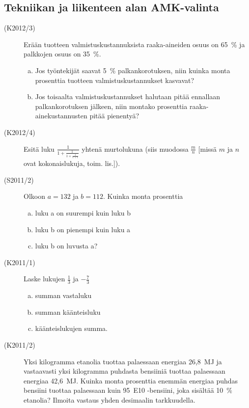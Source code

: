 \subsection{Tekniikan ja liikenteen alan AMK-valinta}

\begin{description}
	\item[(K2012/3)] Erään tuotteen valmistuskustannuksista raaka-aineiden osuus on
        65~\% ja palkkojen osuus on 35~\%.
        
    	\begin{enumerate}[(a)]
    		\item Jos työntekijät saavat 5~\% palkankorotuksen, niin kuinka monta
                prosenttia tuotteen valmistuskustannukset kasvavat?
    		\item Jos toisaalta valmistuskustannukset halutaan pitää ennallaan
                palkankorotuksen jälkeen, niin montako prosenttia raaka-ainekustannusten
                pitää pienentyä?
    	\end{enumerate}	 

	\item[(K2012/4)] Esitä luku $\frac{1}{1+\frac{1}{1+\frac{1}{1+1}}}$ yhtenä murtolukuna (siis muodossa $\frac{m}{n}$ [missä $m$ ja $n$ ovat kokonaislukuja, toim. lis.]).
	\item[(S2011/2)] Olkoon $a=132$ ja  $b=112$. Kuinka monta prosenttia 
		\begin{enumerate}[(a)]
			\item luku a on suurempi kuin luku b
			\item luku b on pienempi kuin luku a
			\item luku b on luvusta a? 
		\end{enumerate}
	\item[(K2011/1)] Laske lukujen $\frac{1}{3}$ ja $-\frac{7}{3}$
		\begin{enumerate}[(a)]
			\item summan vastaluku
			\item summan käänteisluku 
			\item käänteislukujen summa.
		\end{enumerate}
	\item[(K2011/2)] Yksi kilogramma etanolia tuottaa palaessaan energiaa 26,8~MJ
        ja vastaavasti yksi kilogramma puhdasta bensiiniä tuottaa palaessaan energiaa
        42,6~MJ. Kuinka monta prosenttia enemmän energiaa puhdas bensiini tuottaa
        palaessaan kuin 95~E10 -bensiini, joka sisältää 10~\% etanolia? Ilmoita
        vastaus yhden desimaalin tarkkuudella. 
\end{description}


